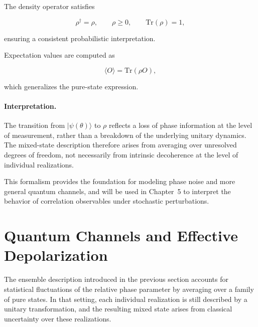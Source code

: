 \medskip

The density operator satisfies

\begin{equation}
\rho^\dagger = \rho,
\qquad
\rho \ge 0,
\qquad
\mathrm{Tr}(\rho)=1,
\label{eq:density_operator_properties}
\end{equation}

ensuring a consistent probabilistic interpretation.

\medskip

Expectation values are computed as

\begin{equation}
\langle O \rangle
=
\mathrm{Tr}(\rho O),
\label{eq:density_expectation_chapter3}
\end{equation}

which generalizes the pure-state expression.

\medskip

\paragraph{Interpretation.}

The transition from \( |\psi(\theta)\rangle \) to \( \rho \) reflects a loss of phase information at the level of measurement, rather than a breakdown of the underlying unitary dynamics. The mixed-state description therefore arises from averaging over unresolved degrees of freedom, not necessarily from intrinsic decoherence at the level of individual realizations.

\medskip

This formalism provides the foundation for modeling phase noise and more general quantum channels, and will be used in Chapter~5 to interpret the behavior of correlation observables under stochastic perturbations.


\section{Quantum Channels and Effective Depolarization}

The ensemble description introduced in the previous section accounts for statistical fluctuations of the relative phase parameter by averaging over a family of pure states. In that setting, each individual realization is still described by a unitary transformation, and the resulting mixed state arises from classical uncertainty over these realizations.

